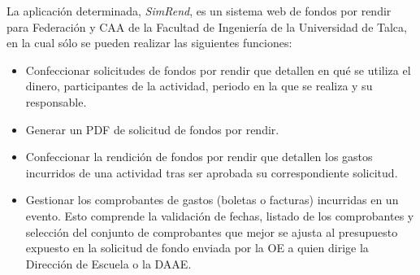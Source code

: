 La aplicación determinada, \emph{SimRend}, es un sistema web de fondos por rendir para Federación y CAA de la Facultad de Ingeniería de la Universidad de Talca, en la cual sólo se pueden realizar las siguientes funciones:

\begin{itemize}
    \item Confeccionar solicitudes de fondos por rendir que detallen en qué se utiliza el dinero, participantes de la actividad, periodo en la que se realiza y su responsable.
    
    \item Generar un PDF de solicitud de fondos por rendir.

    \item Confeccionar la rendición de fondos por rendir que detallen los gastos incurridos de una actividad tras ser aprobada su correspondiente solicitud.
    
    \item Gestionar los comprobantes de gastos (boletas o facturas) incurridas en un evento. Esto comprende la validación de fechas, listado de los comprobantes y selección del conjunto de comprobantes que mejor se ajusta al presupuesto expuesto en la solicitud de fondo enviada por la OE a quien dirige la Dirección de Escuela o la DAAE.
    
\end{itemize}